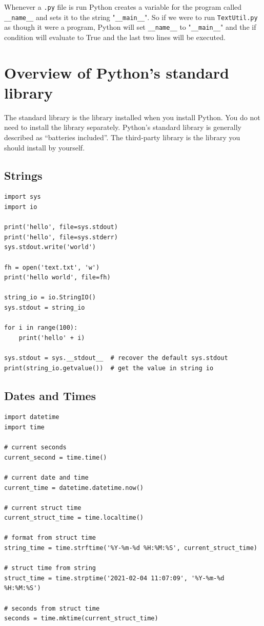 Whenever a \verb|.py| file is run Python creates a variable for the program called \verb|__name__| and sets it to the string "\verb|__main__|".
So if we were to run \verb|TextUtil.py| as though it were a program, Python will set \verb|__name__| to "\verb|__main__|" and the if condition will evaluate to True and the last two lines will be executed.




\section{Overview of Python’s standard library}

The standard library is the library installed when you install Python.
You do not need to install the library separately.
Python's standard library is generally described as ``batteries included''.
The third-party library is the library you should install by yourself.

\subsection{Strings}

\begin{lstlisting}
import sys
import io

print('hello', file=sys.stdout)
print('hello', file=sys.stderr)
sys.stdout.write('world')

fh = open('text.txt', 'w')
print('hello world', file=fh)

string_io = io.StringIO()
sys.stdout = string_io

for i in range(100):
    print('hello' + i)

sys.stdout = sys.__stdout__  # recover the default sys.stdout
print(string_io.getvalue())  # get the value in string io
\end{lstlisting}

\subsection{Dates and Times}

\begin{lstlisting}
import datetime
import time

# current seconds
current_second = time.time()

# current date and time
current_time = datetime.datetime.now()

# current struct time
current_struct_time = time.localtime()

# format from struct time
string_time = time.strftime('%Y-%m-%d %H:%M:%S', current_struct_time)

# struct time from string
struct_time = time.strptime('2021-02-04 11:07:09', '%Y-%m-%d %H:%M:%S')

# seconds from struct time
seconds = time.mktime(current_struct_time)  
\end{lstlisting}

